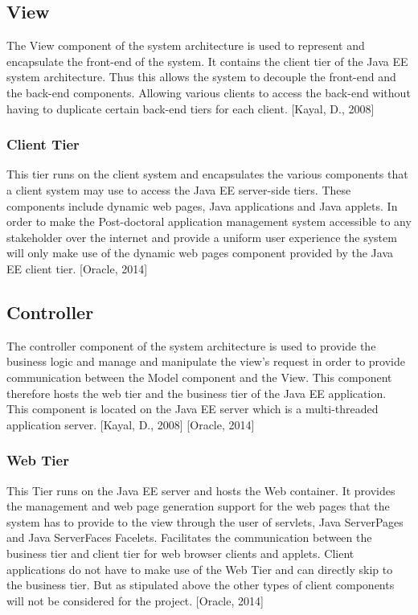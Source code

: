 \documentclass[12pt]{article}
\begin{document}
\subsection{View}
The View component of the system architecture is used to represent and encapsulate the front-end of the system. It contains the client tier of the Java EE system architecture. Thus this allows the system to decouple the front-end and the back-end components. Allowing various clients to access the back-end without having to duplicate certain back-end tiers for each client. [Kayal, D., 2008]
\subsubsection{Client Tier}
This tier runs on the client system and encapsulates the various components that a client system may use to access the Java EE server-side tiers. These components include dynamic web pages, Java applications and Java applets. In order to make the Post-doctoral application management system accessible to any stakeholder over the internet and provide a uniform user experience the system will only make use of the dynamic web pages component provided by the Java EE client tier. [Oracle, 2014]  
\subsection{Controller}
The controller component of the system architecture is used to provide the business logic and manage and manipulate the view's request in order to provide communication between the Model component and the View. This component therefore hosts the web tier and the business tier of the Java EE application. This component is located on the Java EE server which is a multi-threaded application server. [Kayal, D., 2008] [Oracle, 2014] 
\subsubsection{Web Tier}
This Tier runs on the Java EE server and hosts the Web container. It provides the management and web page generation support for the web pages that the system has to provide to the view through the user of servlets, Java ServerPages and Java ServerFaces Facelets. Facilitates the communication between the business tier and client tier for web browser clients and applets. Client applications do not have to make use of the Web Tier and can directly skip to the business tier. But as stipulated above the other types of client components will not be considered for the project. [Oracle, 2014]
\end{document}
